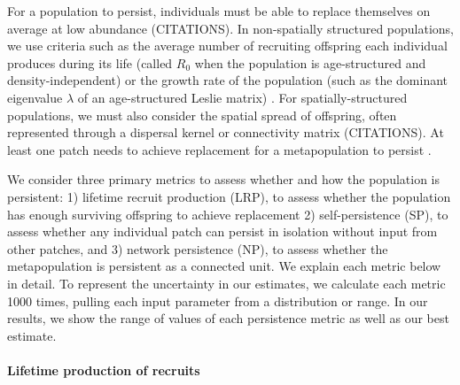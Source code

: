 \documentclass[12pt, oneside]{article}   	%
\begin{document}
For a population to persist, individuals must be able to replace themselves on average at low abundance (CITATIONS). In non-spatially structured populations, we use criteria such as the average number of recruiting offspring each individual produces during its life (called $R_0$ when the population is age-structured and density-independent) or the growth rate of the population (such as the dominant eigenvalue $\lambda$ of an age-structured Leslie matrix) \citep{caswell_matrix_2001, burgess2014beyond}. For spatially-structured populations, we must also consider the spatial spread of offspring, often represented through a dispersal kernel or connectivity matrix (CITATIONS). At least one patch needs to achieve replacement for a metapopulation to persist \citep{hastings_persistence_2006}.  %

We consider three primary metrics to assess whether and how the population is persistent: 1) lifetime recruit production (LRP), to assess whether the population has enough surviving offspring to achieve replacement 2) self-persistence (SP), to assess whether any individual patch can persist in isolation without input from other patches, and 3) network persistence (NP), to assess whether the metapopulation is persistent as a connected unit. We explain each metric below in detail. To represent the uncertainty in our estimates, we calculate each metric 1000 times, pulling each input parameter from a distribution or range. In our results, we show the range of values of each persistence metric as well as our best estimate. %

\paragraph*{Lifetime production of recruits}
\end{document}
